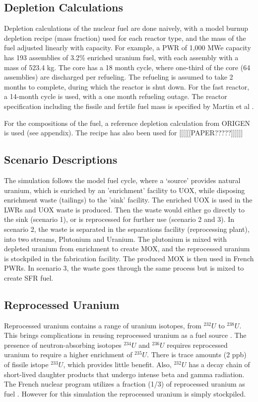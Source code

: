 \subsection{Depletion Calculations}
Depletion calculations of the nuclear fuel are done
naively, with a model burnup depletion recipe (mass fraction) used
for each reactor type, and the mass of the fuel 
adjusted linearly with capacity. For example, a PWR of
1,000 MWe capacity has 193 assemblies of 3.2\% enriched
uranium fuel, with each assembly with a mass of 523.4 kg.
The core has a 18 month cycle, where one-third of the 
core (64 assemblies) are discharged per refueling. The refueling
is assumed to take 2 months to complete, during which the reactor
is shut down. 
For the fast reactor, a 14-month cycle is used, with a one month
refueling outage. The reactor specification including the 
fissile and fertile fuel mass is specified by Martin et al \cite{martin_symbiotic_2017}.

For the compositions of the fuel, a reference depletion calculation
from ORIGEN is used (see appendix). The recipe has also been used for
[[[[[[PAPER?????]]]]]]

\subsection{Scenario Descriptions}
The simulation follows the model fuel cycle, where a `source'
provides natural uranium, which is enriched by an 'enrichment'
facility to \gls{UOX}, while disposing enrichment waste (tailings)
to the 'sink' facility. The enriched \gls{UOX} is used
in the \gls{LWR}s and \gls{UOX} waste is produced. Then the waste
would either go directly to the sink (scenario 1), or is reprocessed
for further use (scenario 2 and 3). In scenario 2, the waste is 
separated in the separations facility (reprocessing plant), into
two streams, Plutonium and Uranium. The plutonium is mixed with depleted uranium from enrichment
to create \gls{MOX}, and the reprocessed uranium is stockpiled in the fabrication facility.
The produced \gls{MOX} is then used in French \gls{PWR}s.
In scenario 3, the waste goes through the same process but is mixed
to create \gls{SFR} fuel.



\subsection{Reprocessed Uranium}
Reprocessed uranium contains a range of uranium isotopes, from $^{232}U$ to $^{238}U$.
This brings complications in reusing reprocessed uranium as a fuel source \cite{IAEA_management_2007}.
The presence of neutron-absorbing isotopes $^{234}U$ and $^{236}U$ requires reprocessed uranium
to require a higher enrichment of $^{235}U$. There is trace amounts (2 ppb) of fissile istope $^{233}U$,
which provides little benefit.  
Also, $^{232}U$ has a decay chain of short-lived
daughter products that undergo intense beta and gamma radiation.
The French nuclear program utilizes a fraction (1/3) of reprocessed uranium as fuel \cite{IAEA_management_200&}.
However for this simulation the reprocessed uranium is simply stockpiled.



